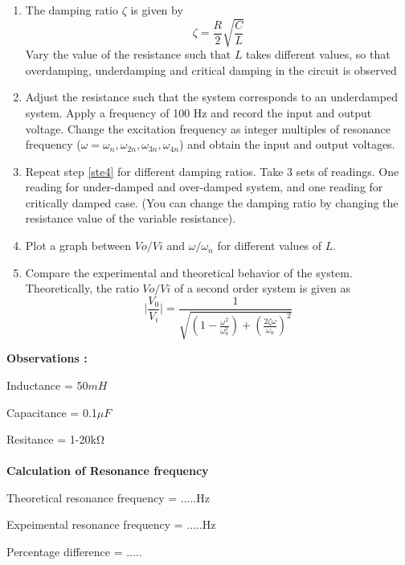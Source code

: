 \documentclass[9pt]{scrreprt}
\begin{document}
\begin{enumerate}
\begin{enumerate}[label=\roman*]
\item The damping ratio $\zeta$ is given by
\begin{equation*}
\zeta = \frac{R}{2}\sqrt{\frac{C}{L}}
\end{equation*}
Vary the value of the resistance such that $L$ takes different values, so that overdamping, underdamping and critical damping in the circuit is observed
\item Adjust the resistance such that the system corresponds to an underdamped system. Apply a frequency of 100 Hz and record the input and output voltage. Change the excitation frequency as integer multiples of resonance frequency ($\omega = \omega_n, \omega_{2n}, \omega_{3n}, \omega_{4n}$) and obtain the input and output voltages.\label{ste4}
\item Repeat step \ref{ste4} for different damping ratios. Take 3 sets of readings. One reading for under-damped and over-damped system, and one reading for critically damped case. (You can change the damping ratio by changing the resistance value of the variable resistance).
\item Plot a graph between $Vo/Vi$ and $\omega/ \omega_n$ for different values of $L$.
\item Compare the experimental and theoretical behavior of the system. Theoretically, the ratio $Vo/Vi$ of a second order system is given as
\begin{equation*}
\bigg\lvert{\frac{V_0}{V_i}}\bigg\rvert = \frac{1}{\sqrt{(1-\frac{\omega^2}{\omega_n^2}) + (\frac{2\zeta\omega}{\omega_n})^2}}
\end{equation*}
\end{enumerate}
\end{enumerate}

\textbf{Observations :}

Inductance = 50$mH$

Capacitance = 0.1$\mu F$

Resitance = 1-20k$\si{\ohm}$\\
\\

\textbf{Calculation of Resonance frequency}

Theoretical resonance frequency = .....Hz

Expeimental resonance frequency = .....Hz

Percentage difference = .....%
\end{document}
